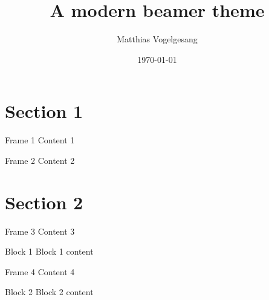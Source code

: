 \documentclass[10pt]{beamer}
\title{A modern beamer theme}
\subtitle{}
\date{\today}
\author{Matthias Vogelgesang}
\institute{Institute or miscellaneous information}
\begin{document}
\maketitle

\section{Section 1}

\begin{frame}{Frame 1}
  Content 1
\end{frame}

\begin{frame}{Frame 2}
  Content 2
\end{frame}

\section{Section 2}

\begin{frame}{Frame 3}
  Content 3
  \begin{block}{Block 1}
    Block 1 content
  \end{block}
\end{frame}


\begin{frame}{Frame 4}
  Content 4
  \begin{block}{Block 2}
    Block 2 content
  \end{block}
\end{frame}
\end{document}
